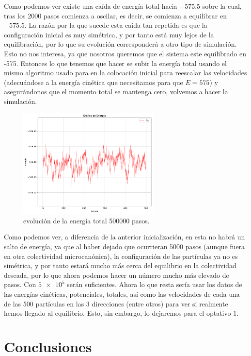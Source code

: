 \documentclass[11pt]{article} %
\begin{document}
Como podemos ver existe una caída de energía total hacia $-575.5$ sobre la cual, tras los 2000 pasos comienza a oscilar, es decir, se comienza a equilibrar en $-575.5$. La razón por la que sucede esta caída tan repetida es que la configuración inicial es muy simétrica, y por tanto está muy lejos de la equilibración, por lo que su evolución corresponderá a otro tipo de simulación. Esto no nos interesa, ya que nosotros queremos que el sistema este equilibrado en -575. Entonces lo que tenemos que hacer se subir la energía total usando el mismo algoritmo usado para en la colocación inicial para reescalar las velocidades (adecuándose a la energía cinética que necesitamos para que $E=575$) y asegurándonos que el momento total se mantenga cero, volvemos a hacer la simulación.


\begin{figure}[h!] \centering
	\includegraphics[width=0.63\textwidth]{../../Graficas/Et-equilibra-500K.pdf}
	\caption{evolución de la energía total 500000 pasos.}
	\label{Fig:04}
\end{figure}	

Como podemos ver, a diferencia de la anterior inicialización, en esta no habrá un salto de energía, ya que al haber dejado que ocurrieran 5000 pasos (aunque fuera en otra colectividad microcanónica), la configuración de las partículas ya no es simétrica, y por tanto estará mucho más cerca del equilibrio en la colectividad deseada, por lo que ahora podemos hacer un número mucho más elevado de pasos. Con $\num{5e5}$ serán suficientes. Ahora lo que resta sería usar los datos de las energías cinéticas, potenciales, totales, así como las velocidades de cada una de las 500 partículas en las 3 direcciones (entre otros) para ver si realmente hemos llegado al equilibrio. Esto, sin embargo, lo dejaremos para el optativo 1.

\section{Conclusiones}
\end{document}
